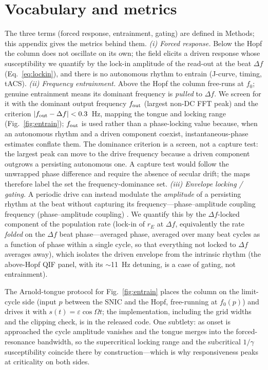 \documentclass[11pt,a4paper]{article}
\providecommand{\DIFaddtex}[1]{{\protect\color{blue} \sf #1}} %
\providecommand{\DIFdeltex}[1]{{\protect\color{red} \scriptsize #1}} %
\providecommand{\DIFaddbegin}{} %
\providecommand{\DIFaddend}{} %
\providecommand{\DIFdelbegin}{} %
\providecommand{\DIFdelend}{} %
\providecommand{\DIFadd}[1]{\texorpdfstring{\DIFaddtex{#1}}{#1}} %
\providecommand{\DIFdel}[1]{\texorpdfstring{\DIFdeltex{#1}}{}} %
\begin{document}
\section{Vocabulary and metrics}\label{sec:vocab}
The three terms (forced response, entrainment, gating) are defined in Methods; this
appendix gives the metrics behind them.
\emph{(i) Forced response.} Below the Hopf the column does not oscillate on its own; the
field elicits a driven response whose susceptibility we quantify by the lock-in amplitude
of the read-out at the beat $\Delta f$ (Eq.~\eqref{eq:lockin}), and there is no autonomous
rhythm to entrain (J-curve, timing, tACS).
\emph{(ii) Frequency entrainment.} Above the Hopf the column free-runs at $f_0$; genuine
entrainment means its dominant frequency is \emph{pulled} to $\Delta f$. We screen for it with
the dominant output frequency $f_{\rm out}$ (largest non-DC FFT peak) and the criterion
$|f_{\rm out}-\Delta f|<0.3$~Hz, mapping the tongue and locking range
(Fig.~\ref{fig:entrain}); $f_{\rm out}$ is used rather than a phase-locking value
\cite{lachaux1999} because, when an autonomous rhythm and a driven component coexist,
instantaneous-phase estimates conflate them. The dominance criterion is a screen, not a
capture test: the largest peak can move to the drive frequency because a driven component
outgrows a persisting autonomous one. A capture test would follow the unwrapped phase
difference and require the absence of secular drift; the maps therefore label the set the
frequency-dominance set.
\emph{(iii) Envelope locking / gating.} A periodic drive can instead modulate the
\emph{amplitude} of a persisting rhythm at the beat without capturing its
\DIFdelbegin \DIFdel{frequency---phase--amplitude coupling}\DIFdelend \DIFaddbegin \DIFadd{frequency (phase--amplitude coupling) }\DIFaddend \cite{canolty2010,tort2010}. We quantify this by
the $\Delta f$-locked component of the population rate (lock-in of $r_E$ at $\Delta f$,
equivalently the rate \emph{folded} on the $\Delta f$ beat \DIFdelbegin \DIFdel{phase---averaged }\DIFdelend \DIFaddbegin \DIFadd{phase, averaged }\DIFaddend over many beat
cycles as a function of phase within a single cycle, so that everything not locked to
$\Delta f$ averages away), which isolates the driven envelope from the intrinsic rhythm (the above-Hopf QIF panel,
with its $\sim$11~Hz detuning, is a case of gating, not entrainment).

The Arnold-tongue protocol for Fig.~\ref{fig:entrain} places the column on the limit-cycle side (input $p$ between the SNIC and the Hopf, free-running at $f_0(p)$) and drives it with $s(t)=\varepsilon\cos\Omega t$; the implementation, including the grid widths and the clipping check, is in the released code. One subtlety: as onset is approached the cycle amplitude vanishes and the tongue merges into the forced-resonance bandwidth, so the supercritical locking range and the subcritical $1/\gamma$ susceptibility coincide there by construction---which is why responsiveness peaks at criticality on both sides.
\end{document}

